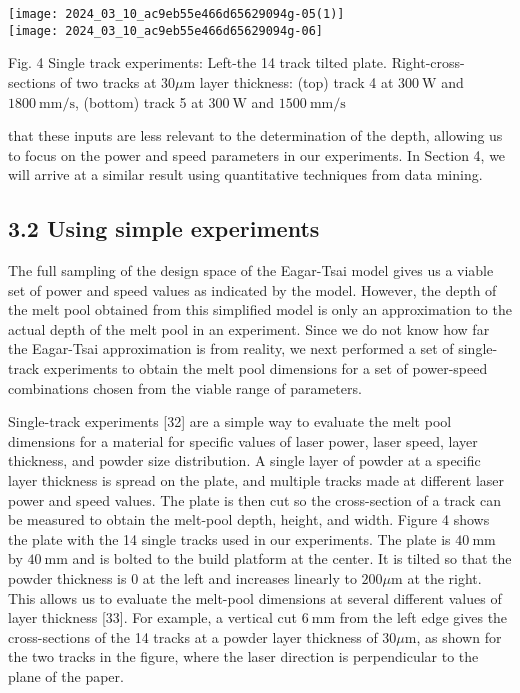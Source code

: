 \documentclass[10pt]{article}
\begin{document}
\texttt{[image: 2024\_03\_10\_ac9eb55e466d65629094g-05(1)]}\\
\texttt{[image: 2024\_03\_10\_ac9eb55e466d65629094g-06]}

Fig. 4 Single track experiments: Left-the 14 track tilted plate. Right-cross-sections of two tracks at $30 \mu \mathrm{m}$ layer thickness: (top) track 4 at $300 \mathrm{~W}$ and $1800 \mathrm{~mm} / \mathrm{s}$, (bottom) track 5 at $300 \mathrm{~W}$ and $1500 \mathrm{~mm} / \mathrm{s}$

that these inputs are less relevant to the determination of the depth, allowing us to focus on the power and speed parameters in our experiments. In Section 4, we will arrive at a similar result using quantitative techniques from data mining.

\subsection*{3.2 Using simple experiments}
The full sampling of the design space of the Eagar-Tsai model gives us a viable set of power and speed values as indicated by the model. However, the depth of the melt pool obtained from this simplified model is only an approximation to the actual depth of the melt pool in an experiment. Since we do not know how far the Eagar-Tsai approximation is from reality, we next performed a set of single-track experiments to obtain the melt pool dimensions for a set of power-speed combinations chosen from the viable range of parameters.

Single-track experiments [32] are a simple way to evaluate the melt pool dimensions for a material for specific values of laser power, laser speed, layer thickness, and powder size distribution. A single layer of powder at a specific layer thickness is spread on the plate, and multiple tracks made at different laser power and speed values. The plate is then cut so the cross-section of a track can be measured to obtain the melt-pool depth, height, and width. Figure 4 shows the plate with the 14 single tracks used in our experiments. The plate is $40 \mathrm{~mm}$ by $40 \mathrm{~mm}$ and is bolted to the build platform at the center. It is tilted so that the powder thickness is 0 at the left and increases linearly to $200 \mu \mathrm{m}$ at the right. This allows us to evaluate the melt-pool dimensions at several different values of layer thickness [33]. For example, a vertical cut $6 \mathrm{~mm}$ from the left edge gives the cross-sections of the 14 tracks at a powder layer thickness of $30 \mu \mathrm{m}$, as shown for the two tracks in the figure, where the laser direction is perpendicular to the plane of the paper.
\end{document}
